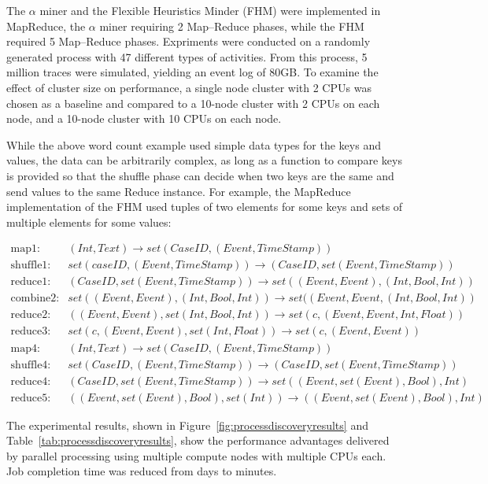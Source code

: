 The $\alpha$ miner and the Flexible Heuristics Minder (FHM) were implemented in MapReduce, the $\alpha$ miner requiring 2 Map--Reduce phases, while the FHM required 5 Map--Reduce phases. Expriments were conducted on a randomly generated process with 47 different types of activities. From this process, 5 million traces were simulated, yielding an event log of 80GB. To examine the effect of cluster size on performance, a single node cluster with 2 CPUs was chosen as a baseline and compared to a 10-node cluster with 2 CPUs on each node, and a 10-node cluster with 10 CPUs on each node. 

While the above word count example used simple data types for the keys and values, the data can be arbitrarily complex, as long as a function to compare keys is provided so that the shuffle phase can decide when two keys are the same and send values to the same Reduce instance. For example, the MapReduce implementation of the FHM used tuples of two elements for some keys and sets of multiple elements for some values:

\footnotesize
\begin{align*}
\text{map1:} &(Int, Text) \rightarrow set(CaseID, (Event, TimeStamp)) \\
\text{shuffle1:} &set(caseID, (Event, TimeStamp)) \rightarrow (CaseID, set(Event, TimeStamp)) \\
\text{reduce1:}  &(CaseID, set(Event, TimeStamp)) \rightarrow set((Event, Event), (Int, Bool, Int)) \\
\text{combine2:} &set((Event, Event), (Int, Bool, Int)) \rightarrow set((Event, Event, (Int, Bool, Int)) \\
\text{reduce2:}   &((Event, Event), set(Int, Bool, Int)) \rightarrow set(c, (Event, Event, Int, Float)) \\
\text{reduce3:}  & set(c, (Event, Event), set(Int, Float)) \rightarrow set(c, (Event, Event)) \\
\text{map4:}     & (Int, Text) \rightarrow set(CaseID, (Event, TimeStamp)) \\
\text{shuffle4:} & set(CaseID, (Event, TimeStamp)) \rightarrow (CaseID, set(Event, TimeStamp)) \\
\text{reduce4:}  & (CaseID, set(Event, TimeStamp)) \rightarrow set((Event, set(Event), Bool), Int) \\
\text{reduce5:}  & ((Event, set(Event), Bool), set(Int)) \rightarrow ((Event, set(Event), Bool), Int) 
\end{align*}
\normalsize

The experimental results, shown in Figure~\ref{fig:processdiscoveryresults} and Table~\ref{tab:processdiscoveryresults}, show the performance advantages delivered by parallel processing using multiple compute nodes with multiple CPUs each. Job completion time was reduced from days to minutes. 

